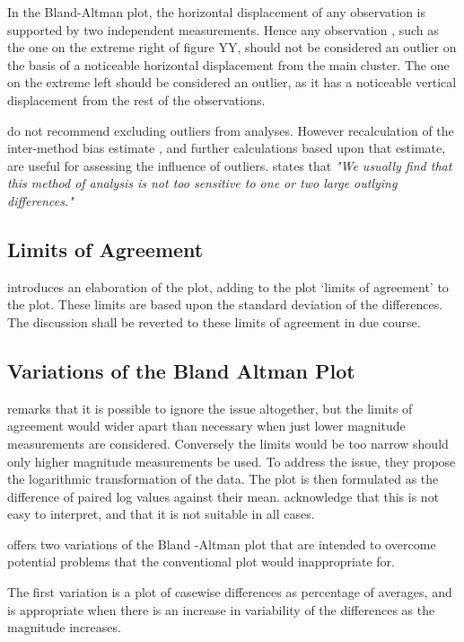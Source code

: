 \documentclass[12pt, a4paper]{report}
\begin{document}
In the Bland-Altman plot, the horizontal displacement of any observation is supported by two independent measurements. Hence
any observation , such as the one on the extreme right of figure YY, should not be considered an outlier on the basis of a
noticeable horizontal displacement from the main cluster. The one on the extreme left should be considered an outlier, as it has a
noticeable vertical displacement from the rest of the observations.

\citet*{BA99} do not recommend excluding outliers from analyses. However recalculation of the inter-method bias estimate , and
further calculations based upon that estimate, are useful for assessing the influence of outliers.\citep{BA99} states that
\emph{"We usually find that this method of analysis is not too sensitive to one or two large outlying differences."}

\subsection{Limits of Agreement}
\citet{BA86} introduces an elaboration of the plot, adding to the plot `limits of agreement' to the plot. These limits are based
upon the standard deviation of the differences. The discussion shall be reverted to these limits of agreement in due course.

\subsection{Variations of the Bland Altman Plot}
\citet{BA99} remarks that it is possible to ignore the issue altogether, but the limits of agreement would wider apart than
necessary when just lower magnitude measurements are considered. Conversely the limits would be too narrow should only higher
magnitude measurements be used. To address the issue, they propose the logarithmic transformation of the data. The plot is then
formulated as the difference of paired log values against their mean. \citet{BA99} acknowledge that this is not easy to interpret,
and that it is not suitable in all cases.

\citet{BA99} offers two variations of the Bland -Altman plot that are intended to overcome potential problems that the conventional
plot would inappropriate for.

The first variation is a plot of casewise differences as percentage of averages, and is appropriate when there is an
increase in variability of the differences as the magnitude increases.
\end{document}
